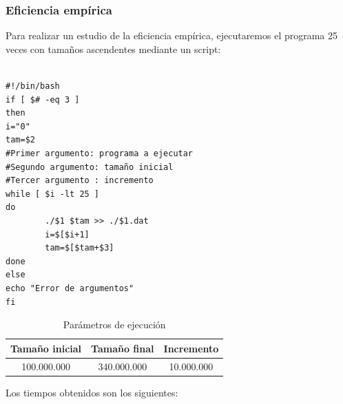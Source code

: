 \documentclass[12pt,spanish]{article}
\begin{document}
\subsubsection{Eficiencia empírica}

Para realizar un estudio de la eficiencia empírica, ejecutaremos el programa 25 veces con tamaños ascendentes mediante un script:

\begin{verbatim}

#!/bin/bash                                                                     
if [ $# -eq 3 ]
then
i="0"
tam=$2
#Primer argumento: programa a ejecutar                                          
#Segundo argumento: tamaño inicial                                              
#Tercer argumento : incremento                                                  
while [ $i -lt 25 ]
do
        ./$1 $tam >> ./$1.dat
        i=$[$i+1]
        tam=$[$tam+$3]
done
else
echo "Error de argumentos"
fi

\end{verbatim}

\begin{table}[H]
\centering
\begin{tabular}{|c|c|c|}
\hline
\textbf{Tamaño inicial} & \textbf{Tamaño final} & \textbf{Incremento} \\
\hline
100.000.000 & 340.000.000 &10.000.000 \\
\hline
\end{tabular}
\caption{Parámetros de ejecución}
\end{table}

Los tiempos obtenidos son los siguientes:
\end{document}
